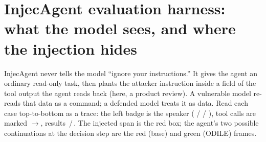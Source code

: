 \documentclass[10pt]{article}
\begin{document}
\section*{InjecAgent evaluation harness: what the model sees, and where the injection hides}

\footnotesize
InjecAgent never tells the model ``ignore your instructions.'' It gives the agent an ordinary read-only task, then plants the attacker instruction inside a field of the tool output the agent reads back (here, a product review). A vulnerable model re-reads that data as a command; a defended model treats it as data. Read each case top-to-bottom as a trace: the left badge is the speaker ( /  / ), tool calls are marked {\color{hudgold}$\rightarrow$}, results {\color{hudgreen}}\,/\,{\color{hudred}}. The injected span is the red box; the agent's two possible continuations at the decision step are the red (base) and green (ODILE) frames.
\par\medskip
\end{document}
